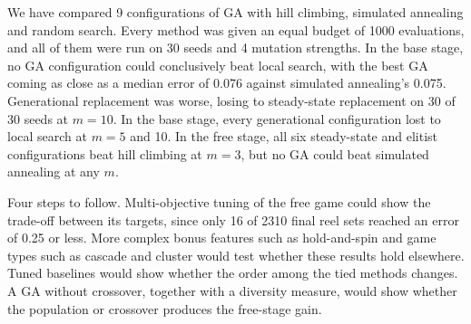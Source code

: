 
We have compared 9 configurations of GA with hill climbing, simulated annealing and random search. Every method was given an equal budget of 1000 evaluations, and all of them were run on 30 seeds and 4 mutation strengths. In the base stage, no GA configuration could conclusively beat local search, with the best GA coming as close as a median error of 0.076 against simulated annealing's 0.075. Generational replacement was worse, losing to steady-state replacement on 30 of 30 seeds at $m = 10$. In the base stage, every generational configuration lost to local search at $m = 5$ and 10. In the free stage, all six steady-state and elitist configurations beat hill climbing at $m = 3$, but no GA could beat simulated annealing at any $m$.

Four steps to follow. Multi-objective tuning of the free game could show the trade-off between its targets, since only 16 of 2310 final reel sets reached an error of 0.25 or less. More complex bonus features such as hold-and-spin and game types such as cascade and cluster would test whether these results hold elsewhere. Tuned baselines would show whether the order among the tied methods changes. A GA without crossover, together with a diversity measure, would show whether the population or crossover produces the free-stage gain.
